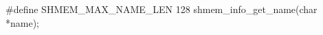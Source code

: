 \synC
#define SHMEM_MAX_NAME_LEN 128
shmem\_info\_get\_name(char *name);

\synF



{
	
}
{
		\desR{}
	\notesB{}
}
		
\exampleB{
}
\eAPI

